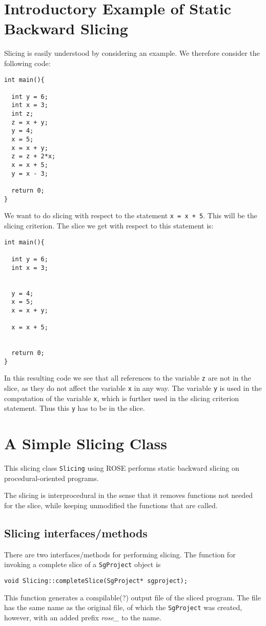 \documentclass[11pt,a4paper,twoside]{article}
\begin{document}
\section{Introductory Example of Static Backward Slicing}
Slicing is easily understood by considering an example. We therefore consider the following code:
\scriptsize
\begin{verbatim}
int main(){

  int y = 6;
  int x = 3;
  int z;
  z = x + y;
  y = 4;
  x = 5;
  x = x + y;
  z = z + 2*x;
  x = x + 5;
  y = x - 3;
  
  return 0;
}
\end{verbatim}
\normalsize
We want to do slicing with respect to the statement \texttt{x = x + 5}. This will be the slicing criterion. The slice we get with respect to this statement is:
\scriptsize
\begin{verbatim}
int main(){

  int y = 6;
  int x = 3;


  y = 4;
  x = 5;
  x = x + y;

  x = x + 5;

  
  return 0;
}
\end{verbatim}
\normalsize
In this resulting code we see that all references to the variable \texttt{z} are not in the slice, as they do not affect the variable \texttt{x} in any way. The variable \texttt{y} is used in the computation of the variable \texttt{x}, which is further used in the slicing criterion statement. Thus this \texttt{y} has to be in the slice.


\section{A Simple Slicing Class}

This slicing class \texttt{Slicing} using ROSE performs static backward slicing on procedural-oriented programs.

The slicing is interprocedural in the sense that it removes functions not needed for the slice, while keeping unmodified the functions that are called.

\subsection{Slicing interfaces/methods}
\label{sec:interface}
There are two interfaces/methods for performing slicing. The function for invoking a complete slice of a \texttt{SgProject} object is
\begin{verbatim}
void Slicing::completeSlice(SgProject* sgproject);
\end{verbatim} 
This function generates a compilable(?) output file of the sliced program. The file has the same name as the original file, of which the \texttt{SgProject} was created, however, with an added prefix \textit{rose\_} to the name.
\end{document}
